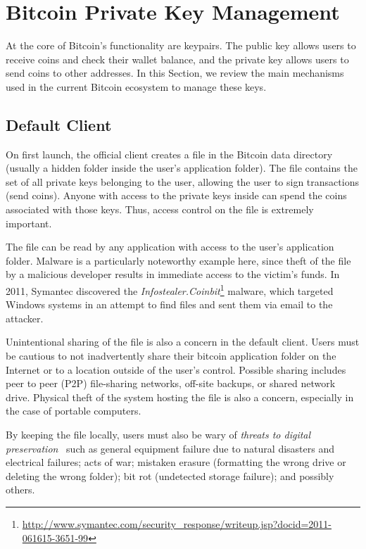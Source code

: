 
\section{Bitcoin Private Key Management}
At the core of Bitcoin's functionality are keypairs. The public key allows users to receive coins and check their wallet balance, and the private key allows users to send coins to other addresses. In this Section, we review the main mechanisms used in the current Bitcoin ecosystem to manage these keys.

\subsection{Default Client}
On first launch, the official \bitcoinclient client creates a \walletfile file in the Bitcoin data directory (usually a hidden folder inside the user's application folder). The \walletfile file contains the set of all private keys belonging to the user, allowing the user to sign transactions (\ie send coins). Anyone with access to the private keys inside \walletfile can spend the coins associated with those keys. Thus, access control on the \walletfile file is extremely important. 

The \walletfile file can be read by any application with access to the user's application folder. Malware is a particularly noteworthy example here, since theft of the \walletfile file by a malicious developer results in immediate access to the victim's funds. In 2011, Symantec discovered the \textit{Infostealer.Coinbit}\footnote{\url{http://www.symantec.com/security_response/writeup.jsp?docid=2011-061615-3651-99}} malware, which targeted Windows systems in an attempt to find \walletfile files and sent them via email to the attacker. 

Unintentional sharing of the \walletfile file is also a concern in the default client. Users must be cautious to not inadvertently share their bitcoin application folder on the Internet or to a location outside of the user's control. Possible sharing includes peer to peer (P2P) file-sharing networks, off-site backups, or shared network drive. Physical theft of the system hosting the \walletfile file is also a concern, especially in the case of portable computers. 

By keeping the \walletfile file locally, users must also be wary of \textit{threats to digital preservation}~\cite{BKM05} such as general equipment failure due to natural disasters and electrical failures; acts of war; mistaken erasure (\eg formatting the wrong drive or deleting the wrong folder); bit rot (\ie undetected storage failure); and possibly others. 

